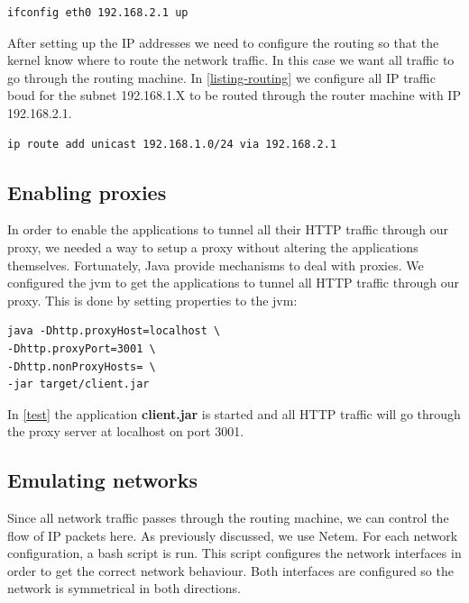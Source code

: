 \begin{lstlisting}[frame=single, caption="Configuring a network interface of the router", label=listing-ifconfig-client]
ifconfig eth0 192.168.2.1 up
\end{lstlisting}

After setting up the IP addresses we need to configure the routing so that the
kernel know where to route the network traffic. In this case we want all
traffic to go through the routing machine. In \cref{listing-routing} we
configure all IP traffic boud for the subnet 192.168.1.X to be routed through
the router machine with IP 192.168.2.1.

\begin{lstlisting}[frame=single, caption="Configuring routing rules for the client", label=listing-routing]
ip route add unicast 192.168.1.0/24 via 192.168.2.1
\end{lstlisting}


\subsection{Enabling proxies}

In order to enable the applications to tunnel all their HTTP traffic through our
proxy, we needed a way to setup a proxy without altering the applications
themselves. Fortunately, Java provide mechanisms to deal with
proxies\cite{oracle-proxy}. We configured the \gls{jvm} to get the applications
to tunnel all HTTP traffic through our proxy. This is done by setting properties
to the \gls{jvm}:


\begin{lstlisting}[frame=single, caption="Setting a proxy on the \gls{jvm}", label=test]
java -Dhttp.proxyHost=localhost \
-Dhttp.proxyPort=3001 \
-Dhttp.nonProxyHosts= \
-jar target/client.jar
\end{lstlisting}

In \cref{test} the application \textbf{client.jar} is started and all HTTP
traffic will go through the proxy server at localhost on port 3001.

\subsection{Emulating networks}

Since all network traffic passes through the routing machine, we can control
the flow of IP packets here. As previously discussed, we use Netem.  For each
network configuration, a bash script is run. This script configures the
network interfaces in order to get the correct network behaviour. Both
interfaces are configured so the network is symmetrical in both directions.

